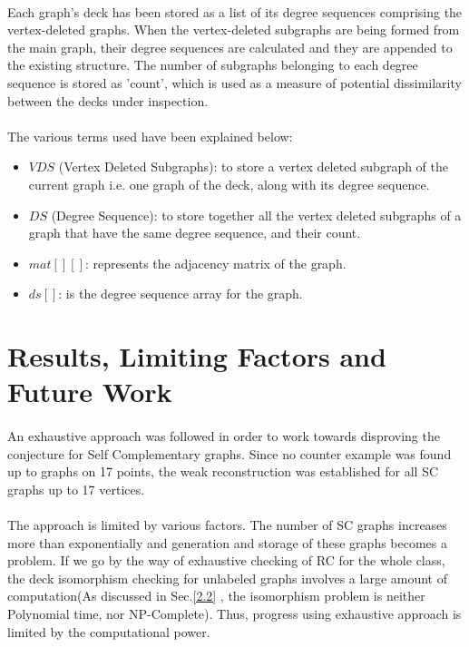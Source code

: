 \documentclass[12pt,conference]{IEEEtran}
\begin{document}
\paragraph*{} Each graph's deck has been stored as a list of its degree sequences comprising the vertex-deleted graphs. When the vertex-deleted subgraphs are being formed from the main graph, their degree sequences are calculated and they are appended to the existing structure. The number of subgraphs belonging to each degree sequence is stored as 'count', which is used as a measure of potential dissimilarity between the decks under inspection. 
\paragraph*{} The various terms used have been explained below: 
\begin{itemize}
\item $VDS$ (Vertex Deleted Subgraphs): to store a vertex deleted subgraph of the current graph i.e. one graph of the deck, along with its degree sequence.
\item $DS$ (Degree Sequence): to store together all the vertex deleted subgraphs of a graph that have the same degree sequence, and their count. 
\item $mat[][]$: represents the adjacency matrix of the graph. 
\item $ds[]$: is the degree sequence array for the graph. 
\end{itemize}





\section{ Results, Limiting Factors and  Future Work }
\paragraph*{} An exhaustive approach was followed in order to work towards disproving the conjecture for Self Complementary graphs. Since no counter example was found up to graphs on 17 points, the weak reconstruction was established for all SC graphs up to 17 vertices. 
\paragraph*{} The approach is limited by various factors. The number of SC graphs increases more than exponentially and generation and storage of these graphs becomes a problem. If we go by the way of exhaustive checking of RC for the whole class, the deck isomorphism checking for unlabeled graphs involves a large amount of computation(As discussed in Sec.\ref{2.2} , the isomorphism problem is neither Polynomial time, nor NP-Complete). Thus, progress using exhaustive approach is limited by the computational power. 
\end{document}

